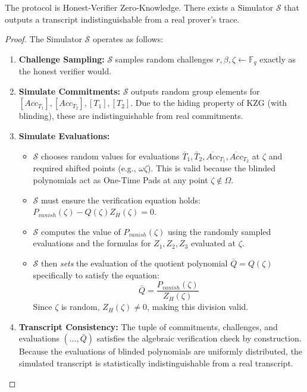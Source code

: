 \begin{theorem}[HVZK]
    The protocol is Honest-Verifier Zero-Knowledge. There exists a Simulator $\mathcal{S}$ that outputs a transcript indistinguishable from a real prover's trace.
\end{theorem}

\begin{proof}
   The Simulator $\mathcal{S}$ operates as follows:

\begin{enumerate}
    \item \textbf{Challenge Sampling:} $\mathcal{S}$ samples random challenges $r, \beta, \zeta \leftarrow \mathbb{F}_q$ exactly as the honest verifier would.
    
    \item \textbf{Simulate Commitments:} $\mathcal{S}$ outputs random group elements for $[Acc_{T_1}], [Acc_{T_2}], [T_1], [T_2]$. Due to the hiding property of KZG (with blinding), these are indistinguishable from real commitments.
    
    \item \textbf{Simulate Evaluations:}
    \begin{itemize}
        \item $\mathcal{S}$ chooses random values for evaluations $\bar{T}_1, \bar{T}_2, \overline{Acc}_{T_1}, \overline{Acc}_{T_2}$ at $\zeta$ and required shifted points (e.g., $\omega\zeta$). This is valid because the blinded polynomials act as One-Time Pads at any point $\zeta \notin \Omega$.
        
        \item $\mathcal{S}$ must ensure the verification equation holds: $P_{vanish}(\zeta) - Q(\zeta)Z_H(\zeta) = 0$.
        
        \item $\mathcal{S}$ computes the value of $P_{vanish}(\zeta)$ using the randomly sampled evaluations and the formulas for $Z_1, Z_2, Z_3$ evaluated at $\zeta$.
        
        \item $\mathcal{S}$ then \textit{sets} the evaluation of the quotient polynomial $\bar{Q} = Q(\zeta)$ specifically to satisfy the equation:
        \[
        \bar{Q} = \frac{P_{vanish}(\zeta)}{Z_H(\zeta)}
        \]
        Since $\zeta$ is random, $Z_H(\zeta) \neq 0$, making this division valid.
    \end{itemize}
    
    \item \textbf{Transcript Consistency:} The tuple of commitments, challenges, and evaluations $(\dots, \bar{Q})$ satisfies the algebraic verification check by construction. Because the evaluations of blinded polynomials are uniformly distributed, the simulated transcript is statistically indistinguishable from a real transcript. 
\end{enumerate}
\end{proof}

